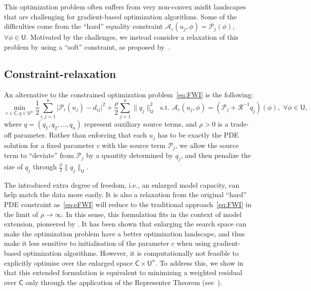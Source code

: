 \documentclass[12pt]{amsart}
\newcommand{\U}{\mathsf{U}}
\begin{document}
This optimization problem often suffers from very non-convex misfit landscapes that are challenging for gradient-based optimization algorithms. Some of the difficulties come from the ``hard'' equality constraint $\mathcal{A}_c(u_j,\phi) = \mathcal{P}_j(\phi)$, $\forall \phi\in \U$. Motivated by the challenges, we instead consider a relaxation of this problem by using a ``soft'' constraint, as proposed by~\cite{van2015penalty}.
  
\subsection{Constraint-relaxation}
An alternative to the constrained optimization problem~\eqref{eq:FWI} is the following:
\begin{equation}\label{eq:eFWI}
\min_{c\in\mathsf{C},q\in\mathsf{U}^n}   {\textstyle\frac{1}{2}} \sum_{i,j=1}^{n}   \big|\mathcal{P}_i(u_j) - d_{ij}\big|^2 +   {\textstyle\frac{\rho}{2}} \sum_{j=1}^n  \|q_j\|_{\mathsf{U}}^2\,\,\,\,\text{s.t.}\,\,\mathcal{A}_c(u_j,\phi) = \left(\mathcal{P}_j + \mathcal{R}^{-1}q_j\right)(\phi),\,\,\forall\phi\in \mathsf{U},
 \end{equation}
where $q = (q_1, q_2, \ldots, q_n)$ represent auxiliary source terms, and $\rho > 0$ is a trade-off parameter. Rather than enforcing that each $u_j$ has to be exactly the PDE solution for a fixed parameter $c$ with the source term $\mathcal{P}_j$, we allow the source term to ``deviate'' from $\mathcal{P}_j$ by a quantity determined by $q_j$, and then penalize the size of $q_j$ through $\frac{\rho}{2} \|q_j\|_\U$. 

The introduced extra degree of freedom, i.e., an enlarged model capacity,  can help match the data more easily. It is also a relaxation from the original ``hard'' PDE constraint as~\eqref{eq:eFWI} will reduce to the traditional approach~\eqref{eq:FWI} in the limit of $\rho\rightarrow \infty$. In this sense, this formulation fits in the context of model extension, pioneered by \cite{Symes2014,Warner2016,Symes2020,symes2020a}. It has been shown that enlarging the search space can make the optimization problem have a better optimization landscape, and thus make it less sensitive to initialisation of the parameter $c$ when using gradient-based optimization algorithms. However, it is computationally not feasible to explicitly optimise over the enlarged space $\mathsf{C}\times \mathsf{U}^n$. To address this, we show in~ that this extended formulation is equivalent to minimizing a weighted residual over $\mathsf{C}$ only through the application of the Representer Theorem (see~).
\end{document}
